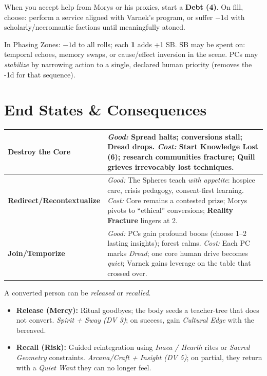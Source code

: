 \documentclass[11pt,twoside]{book}
\newcommand{\Mechanic}[2]{%
  \begin{mechanicbox}[frametitle={#1}]
    #2
  \end{mechanicbox}
}
\begin{document}
\Mechanic{Bone-Ledger Debts}{
When you accept help from Morys or his proxies, start a \textbf{Debt (4)}. On fill, choose: perform a service aligned with Varnek's program, or suffer \(-1\)d with scholarly/necromantic factions until meaningfully atoned.
}

\Mechanic{Reality Fracture Zones}{
In Phasing Zones: \(-1\)d to all rolls; each \textbf{1} adds +1 SB. SB may be spent on: temporal echoes, memory swaps, or cause/effect inversion in the scene. PCs may \emph{stabilize} by narrowing action to a single, declared human priority (removes the -1d for that sequence).
}

\chapter{End States \& Consequences}

\begin{adventurebox}[frametitle=Outcome Matrix]
\renewcommand{\arraystretch}{1.15}
\begin{tabularx}{\linewidth}{@{}p{3.2cm} X@{}}
\toprule
\textbf{Destroy the Core} & \emph{Good:} Spread halts; conversions stall; Dread drops. \emph{Cost:} Start \textbf{Knowledge Lost (6)}; research communities fracture; Quill grieves irrevocably lost techniques. \\
\midrule
\textbf{Redirect/Recontextualize} & \emph{Good:} The Spheres teach \emph{with appetite}: hospice care, crisis pedagogy, consent-first learning. \emph{Cost:} Core remains a contested prize; Morys pivots to ``ethical'' conversions; \textbf{Reality Fracture} lingers at 2. \\
\midrule
\textbf{Join/Temporize} & \emph{Good:} PCs gain profound boons (choose 1--2 lasting insights); forest calms. \emph{Cost:} Each PC marks \emph{Dread}; one core human drive becomes \emph{quiet}; Varnek gains leverage on the table that crossed over. \\
\bottomrule
\end{tabularx}
\end{adventurebox}

\Mechanic{Aftercare: Rescuing the Converted}{
A converted person can be \emph{released} or \emph{recalled}.
\begin{itemize}[leftmargin=*]
  \item \textbf{Release (Mercy):} Ritual goodbyes; the body seeds a teacher-tree that does not convert. \emph{Spirit + Sway (DV 3)}; on success, gain \emph{Cultural Edge} with the bereaved.
  \item \textbf{Recall (Risk):} Guided reintegration using \emph{Inaea / Hearth} rites or \emph{Sacred Geometry} constraints. \emph{Arcana/Craft + Insight (DV 5)}; on partial, they return with a \emph{Quiet Want} they can no longer feel.
\end{itemize}
}
\end{document}
